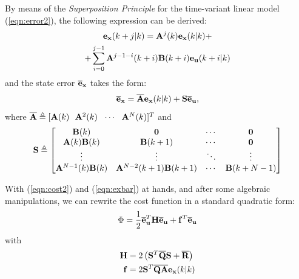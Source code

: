 \documentclass[twocolumn]{IEEEtran} %
\begin{document}
By means of the {\em Superposition Principle} for the time-variant linear model (\ref{eqn:error2}), the following expression can be derived:
\begin{multline*}
	{\bf e}_{\bf x}(k+j|k) = {\bf A}^j(k){\bf e}_{\bf x}(k|k) + \\ + \sum_{i=0}^{j-1}{\bf A}^{j-1-i}(k+i){\bf B}(k+i){\bf e}_{\bf u}(k+i|k)
\end{multline*}
and the state error $\overline{\bf e}_{\bf x}$ takes the form:
\begin{equation}\label{eqn:exbar}
	\overline{\bf e}_{\bf x}=\overline{\bf A}{\bf e}_{\bf x}(k|k)+{\bf S}\overline{\bf e}_{\bf u},
\end{equation}
where $\overline{\bf A} \triangleq [{\bf A}(k)~~{\bf A}^2(k)~~\cdots~~{\bf A}^N(k)]^T$ and
{\small
\begin{equation*}
	{\bf S} \triangleq \begin{bmatrix}
		{\bf B}(k)                 & {\bf 0} 					& \cdots & {\bf 0}       \\
		{\bf A}(k){\bf B}(k)       & {\bf B}(k+1)      			& \cdots & {\bf 0}       \\
		\vdots	                 & \vdots		     		& \ddots & \vdots        \\
		{\bf A}^{N-1}(k){\bf B}(k) & {\bf A}^{N-2}(k+1){\bf B}(k+1) & \cdots & {\bf B}(k+N-1)
	\end{bmatrix}
\end{equation*}}

With (\ref{eqn:cost2}) and (\ref{eqn:exbar}) at hands, and after some algebraic manipulations, we can rewrite the cost function in a standard quadratic form:
\begin{equation}
	\Phi = \frac{1}{2}\overline{\bf e}_{\bf u}^T{\bf H}\overline{\bf e}_{\bf u} + {\bf f}^T\overline{\bf e}_{\bf u}
\end{equation}
with
\begin{align*}
	{\bf H} &= 2\left({\bf S}^T\overline{\bf Q}{\bf S}+\overline{\bf R}\right) \\
	{\bf f} &= 2{\bf S}^T\overline{\bf Q}\overline{\bf A}{\bf e}_{\bf x}(k|k)
\end{align*}
\end{document}
